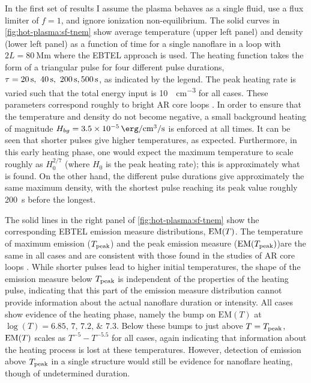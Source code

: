 In the first set of results I assume the plasma behaves as a single fluid, use a flux limiter of $f=1$, and ignore ionization non-equilibrium. The solid curves in \autoref{fig:hot-plasma:sf-tnem} show average temperature (upper left panel) and density (lower left panel) as a function of time for a single nanoflare in a loop with $2L = \SI{80}{\mega\m}$ where the EBTEL approach is used.  The heating function takes the form of a triangular pulse for four different pulse durations, $\tau=\SIlist[list-final-separator = {, }]{20;40;200;500}{\second}$, as indicated by the legend. The peak heating rate is varied such that the total energy input is \SI{10}{\erg\per\cubic\cm} for all cases. These parameters correspond roughly to bright AR core loops \citep{warren_systematic_2012}. In order to ensure that the temperature and density do not become negative, a small background heating of magnitude $H_{bg}=\SI{3.5e-5}{\erg\per\cubic\cm\per\second}$ is enforced at all times. It can be seen that shorter pulses give higher temperatures, as expected. Furthermore, in this early heating phase, one would expect the maximum temperature to scale roughly as $H_0^{2/7}$ (where $H_0$ is the peak heating rate); this is approximately what is found. On the other hand, the different pulse durations give approximately the same maximum density, with the shortest pulse reaching its peak value roughly \SI{200}{\second} before the longest.

The solid lines in the right panel of \autoref{fig:hot-plasma:sf-tnem} show the corresponding EBTEL emission measure distributions, $\emd[T]$. The temperature of maximum emission ($T_\textup{peak}$) and the peak emission measure ($\emd[T_\textup{peak}]$)are the same in all cases and are consistent with those found in the studies of AR core loops \citep[e.g.][]{warren_systematic_2012}. While shorter pulses lead to higher initial temperatures, the shape of the emission measure below $T_\textup{peak}$ is independent of the properties of the heating pulse, indicating that this part of the emission measure distribution cannot provide information about the actual nanoflare duration or intensity. All cases show evidence of the heating phase, namely the bump on $\mathrm{EM}(T)$ at $\log{(T)}=\numlist[list-final-separator = {,}]{6.85;7;7.2;7.3}$. Below these bumps to just above $T = T_\textup{peak}$, $\emd[T]$ scales as $T^{-5}-T^{-5.5}$ for all cases, again indicating that information about the heating process is lost at these temperatures. However, detection of emission above $T_\textup{peak}$ in a single structure would still be evidence for nanoflare heating, though of undetermined duration.

